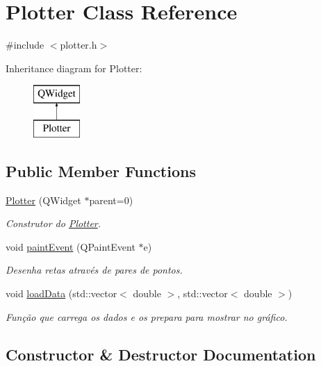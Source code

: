 \hypertarget{class_plotter}{}\section{Plotter Class Reference}
\label{class_plotter}


{\ttfamily \#include $<$plotter.\+h$>$}

Inheritance diagram for Plotter\+:\begin{figure}[H]
\begin{center}
\leavevmode
\includegraphics[height=2.000000cm]{class_plotter}
\end{center}
\end{figure}
\subsection*{Public Member Functions}
\begin{DoxyCompactItemize}
\item 
\mbox{\hyperlink{class_plotter_a367b6890c36910a27ec710ac3693e64b}{Plotter}} (Q\+Widget $\ast$parent=0)
\begin{DoxyCompactList}\small\item\em Construtor do \mbox{\hyperlink{class_plotter}{Plotter}}. \end{DoxyCompactList}\item 
void \mbox{\hyperlink{class_plotter_ac4341569909943e37e1ff756587e6e12}{paint\+Event}} (Q\+Paint\+Event $\ast$e)
\begin{DoxyCompactList}\small\item\em Desenha retas através de pares de pontos. \end{DoxyCompactList}\item 
void \mbox{\hyperlink{class_plotter_ae73b5093b98bbbebd6abdb4e7e7807ed}{load\+Data}} (std\+::vector$<$ double $>$, std\+::vector$<$ double $>$)
\begin{DoxyCompactList}\small\item\em Função que carrega os dados e os prepara para mostrar no gráfico. \end{DoxyCompactList}\end{DoxyCompactItemize}


\subsection{Constructor \& Destructor Documentation}
\mbox{\label{class_plotter_a367b6890c36910a27ec710ac3693e64b}} 
